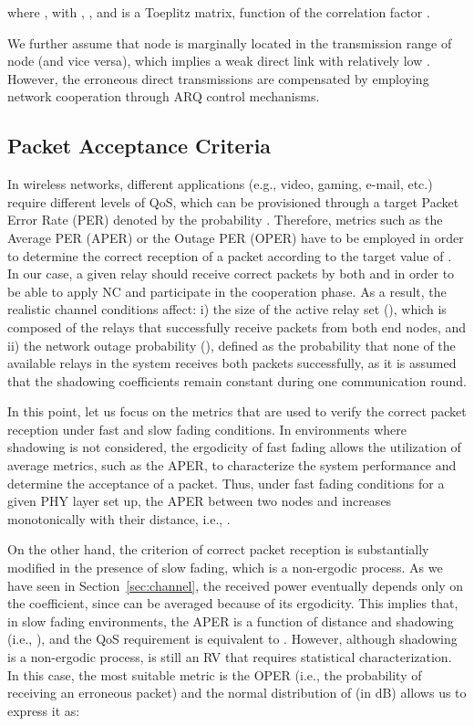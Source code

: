 \documentclass[12pt,draftcls, onecolumn]{IEEEtran}
\begin{document}
\begingroup

\endgroup

\noindent where , with , ,  and  is a Toeplitz matrix, function of the correlation factor .

We further assume that node  is marginally located in the transmission range of node  (and vice versa), which implies a weak direct link with relatively low . However, the erroneous direct transmissions are compensated by employing network cooperation through ARQ control mechanisms.

\subsection{Packet Acceptance Criteria}
\label{sec:criteria}

In wireless networks, different applications (e.g., video, gaming, e-mail, etc.) require different levels of QoS, which can be provisioned through a target Packet Error Rate (PER) denoted by the probability . Therefore, metrics such as the Average PER (APER) or the Outage PER (OPER) have to be employed in order to determine the correct reception of a packet according to the target value of . In our case, a given relay should receive correct packets by both  and  in order to be able to apply NC and participate in the cooperation phase. As a result, the realistic channel conditions affect: i) the size of the active relay set (), which is composed of the relays that successfully receive packets from both end nodes, and ii) the network outage probability (), defined as the probability that none of the available  relays in the system receives both packets successfully, as it is assumed that the shadowing coefficients remain constant during one communication round.

In this point, let us focus on the metrics that are used to verify the correct packet reception under fast and slow fading conditions. In environments where shadowing is not considered, the ergodicity of fast fading allows the utilization of average metrics, such as the APER, to characterize the system performance and determine the acceptance of a packet. Thus, under fast fading conditions for a given PHY layer set up, the APER between two nodes  and  increases monotonically with their distance, i.e.,  \cite{5288484}.

On the other hand, the criterion of correct packet reception is substantially modified in the presence of slow fading, which is a non-ergodic process. As we have seen in Section~\ref{sec:channel}, the received power  eventually depends only on the  coefficient, since  can be averaged because of its ergodicity. This implies that, in slow fading environments, the APER is a function of distance and shadowing (i.e., ), and the QoS requirement  is equivalent to  \cite{5288484}. However, although shadowing is a non-ergodic process,  is still an RV that requires statistical characterization. In this case, the most suitable metric is the OPER (i.e., the probability of receiving an erroneous packet) and the normal distribution of  (in dB) allows us to express it as:
\end{document}
